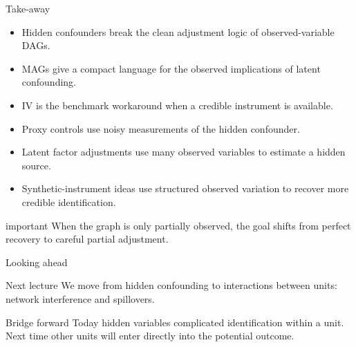 \documentclass[dvipsnames,aspectratio=169,handout]{beamer}
\begin{document}
\begin{frame}{Take-away}
\begin{itemize}
    \item Hidden confounders break the clean adjustment logic of observed-variable DAGs.
    \item MAGs give a compact language for the observed implications of latent confounding.
    \item IV is the benchmark workaround when a credible instrument is available.
    \item Proxy controls use noisy measurements of the hidden confounder.
    \item Latent factor adjustments use many observed variables to estimate a hidden source.
    \item Synthetic-instrument ideas use structured observed variation to recover more credible identification.
\end{itemize}

\vspace{2mm}
\begin{beamercolorbox}[wd=\textwidth,sep=8pt,center,rounded=true,shadow=true]{important}
When the graph is only partially observed, the goal shifts from perfect recovery to careful partial adjustment.
\end{beamercolorbox}
\end{frame}

\begin{frame}{Looking ahead}
\begin{block}{Next lecture}
We move from hidden confounding to interactions between units: network interference and spillovers.
\end{block}

\begin{alertblock}{Bridge forward}
Today hidden variables complicated identification within a unit.
Next time other units will enter directly into the potential outcome.
\end{alertblock}
\end{frame}
\end{document}
